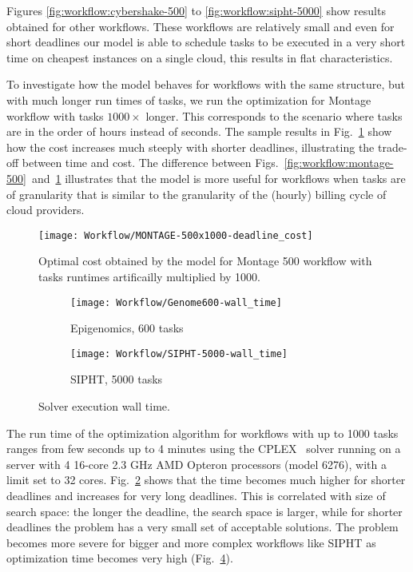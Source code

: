 {    Figures \ref{fig:workflow:cybershake-500} to \ref{fig:workflow:sipht-5000}  show results obtained for other workflows. These workflows are relatively small and even for short deadlines our model is able to schedule tasks to be executed in a very short time on cheapest instances on a single cloud, this results in flat characteristics.
    
    To investigate how the model behaves for workflows with the same structure, but with much longer run times of tasks, we run the optimization for Montage workflow with tasks $1000 \times$ longer. This corresponds to the scenario where tasks are in the order of hours instead of seconds. The sample results in Fig.~\ref{fig:workflow:montage-500x1000} show how the cost increases much steeply with shorter deadlines, illustrating the trade-off between time and cost. The difference between Figs.~\ref{fig:workflow:montage-500}~and~\ref{fig:workflow:montage-500x1000} illustrates that the model is more useful for workflows when tasks are of granularity that is similar to the granularity of the (hourly) billing cycle of cloud providers.    

    \begin{figure}[tb]
       \centering \texttt{[image: Workflow/MONTAGE-500x1000-deadline\_cost]}
       \caption{Optimal cost obtained by the model for Montage 500 workflow with tasks runtimes artificailly 
       multiplied by 1000.
       \label{fig:workflow:montage-500x1000}}
    \end{figure}

    \begin{figure}[tb] 
       \centering
       
       \begin{subfigure}[b]{0.49\textwidth}  
         \texttt{[image: Workflow/Genome600-wall\_time]}
         \caption{Epigenomics, 600 tasks}
         \label{fig:workflow:genome-600-opttime}
       \end{subfigure}
       \begin{subfigure}[b]{0.49\textwidth}
         \texttt{[image: Workflow/SIPHT-5000-wall\_time]}
         \caption{SIPHT, 5000 tasks}
         \label{fig:workflow:sipht-5000-opttime}
       \end{subfigure}
       
       \caption{Solver execution wall time.}
    \end{figure}
  
    
    The run time of the optimization algorithm for workflows with up to 1000 tasks ranges from few seconds up to 4 minutes using the CPLEX~\cite{cplex} solver running on a server with 4 16-core 2.3 GHz AMD Opteron processors (model 6276), with a limit set to 32 cores. Fig.~\ref{fig:workflow:genome-600-opttime} shows that the time becomes much higher for shorter deadlines and increases for very long deadlines. This is correlated with size of search space: the longer the deadline, the search space is larger, while for shorter deadlines the problem has a very small set of acceptable solutions.  The problem becomes more severe for bigger and more complex workflows like SIPHT as optimization time becomes very high (Fig.~\ref{fig:workflow:sipht-5000-opttime}).
    
} %